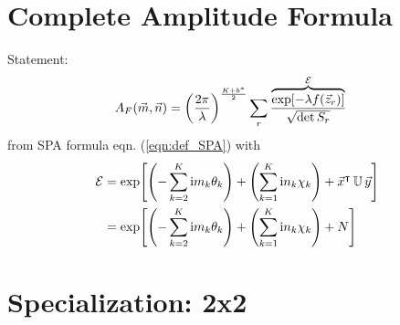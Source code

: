 \documentclass[
	english,
	a4paper,
	fontsize=10pt,
	parskip=half,
	titlepage=true,
	DIV=12,
	final
]{scrreprt}
\newcommand*{\transp}{\ensuremath{^\intercal}}
\newcommand*{\iunit}{\ensuremath{\mathrm{i}}}
\begin{document}
\section{Complete Amplitude Formula}
Statement:
\begin{align}
	A_F(\vec{m}, \vec{n})
&=
	\qty(
		\frac{2\pi}{\lambda}
	)^{\frac{K + b^*}{2}}
	\sum_r
		\frac
		{\overbrace{
			\exp[-\lambda f(\vec{z}_r)]
		}^{\mathcal{E}}}
		{\sqrt{\det S_r}}
\end{align}
from SPA formula eqn. (\ref{eqn:def_SPA}) with
\begin{align}
	\mathcal{E}
&=
	\exp[ 
		\qty(- \sum_{k=2}^{K} \iunit m_k \theta_k) + 
		\qty(  \sum_{k=1}^{K} \iunit n_k \chi_k)   +
		\vec{x}\transp \, \mathbb{U} \, \vec{y}
	] \\
&=
	\exp[ 
		\qty(- \sum_{k=2}^{K} \iunit m_k \theta_k) + 
		\qty(  \sum_{k=1}^{K} \iunit n_k \chi_k)   +
		N
	]
\end{align}

\section{Specialization: 2x2}
\end{document}
